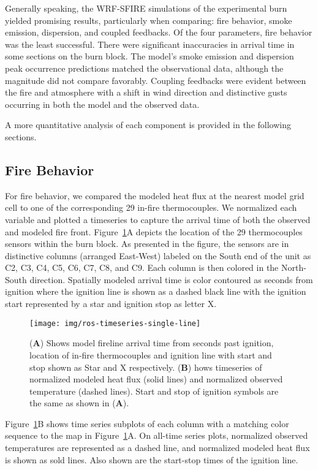 \documentclass[preprints,article,accept,moreauthors,pdftex]{Definitions/mdpi}
\begin{document}
Generally speaking, the WRF-SFIRE simulations of the experimental burn yielded promising results, particularly when comparing: fire behavior, smoke emission, dispersion, and coupled feedbacks. Of the four parameters, fire behavior was the least successful. There were significant inaccuracies in arrival time in some sections on the burn block. The model’s smoke emission and dispersion peak occurrence predictions matched the observational data, although the magnitude did not compare favorably.
Coupling feedbacks were evident between the fire and atmosphere with a shift in wind direction and distinctive gusts occurring in both the model and the observed data.

A more quantitative analysis of each component is provided in the following sections.

\subsection{Fire Behavior}

For fire behavior, we compared the modeled heat flux at the nearest model grid cell to one of the corresponding 29 in-fire thermocouples. We normalized each variable and plotted a timeseries to capture the arrival time of both the observed and modeled fire front. Figure~\ref{fig2}A depicts the location of the 29 thermocouples sensors within the burn block. As presented in the figure, the sensors are in distinctive columns (arranged East-West) labeled on the South end of the unit as C2, C3, C4, C5, C6, C7, C8, and C9. Each column is then colored in the North-South direction. Spatially modeled arrival time is color contoured as seconds from ignition where the ignition line is shown as a dashed black line with the ignition start represented by a star and ignition stop as letter X.

\begin{figure}[H]
\centering
 \texttt{[image: img/ros-timeseries-single-line]}
 \caption{(\textbf{A}) Shows model fireline arrival time from seconds past ignition, location of in-fire thermocouples and ignition line with start and stop shown as Star and X respectively. (\textbf{B}) hows timeseries of normalized modeled heat flux (solid lines) and normalized observed temperature (dashed lines). Start and stop of ignition symbols are the same as shown in (\textbf{A}). \label{fig2}}
 \end{figure}

Figure~\ref{fig2}B shows time series subplots of each column with a matching color sequence to the map in Figure~\ref{fig2}A. On all-time series plots, normalized observed temperatures are represented as a dashed line, and normalized modeled heat flux is shown as sold lines. Also shown are the start-stop times of the ignition line.
\end{document}
